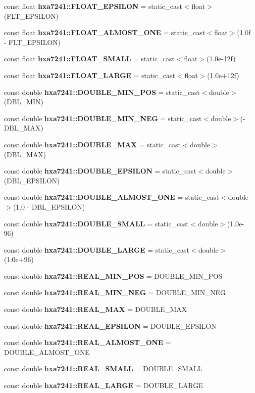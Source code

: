 \begin{CompactItemize}
\item 
const float {\bf hxa7241::FLOAT\_\-EPSILON} = static\_\-cast$<$float$>$(FLT\_\-EPSILON)
\item 
const float {\bf hxa7241::FLOAT\_\-ALMOST\_\-ONE} = static\_\-cast$<$float$>$(1.0f - FLT\_\-EPSILON)
\item 
const float {\bf hxa7241::FLOAT\_\-SMALL} = static\_\-cast$<$float$>$(1.0e-12f)
\item 
const float {\bf hxa7241::FLOAT\_\-LARGE} = static\_\-cast$<$float$>$(1.0e+12f)
\item 
const double {\bf hxa7241::DOUBLE\_\-MIN\_\-POS} = static\_\-cast$<$double$>$(DBL\_\-MIN)
\item 
const double {\bf hxa7241::DOUBLE\_\-MIN\_\-NEG} = static\_\-cast$<$double$>$(-DBL\_\-MAX)
\item 
const double {\bf hxa7241::DOUBLE\_\-MAX} = static\_\-cast$<$double$>$(DBL\_\-MAX)
\item 
const double {\bf hxa7241::DOUBLE\_\-EPSILON} = static\_\-cast$<$double$>$(DBL\_\-EPSILON)
\item 
const double {\bf hxa7241::DOUBLE\_\-ALMOST\_\-ONE} = static\_\-cast$<$double$>$(1.0 - DBL\_\-EPSILON)
\item 
const double {\bf hxa7241::DOUBLE\_\-SMALL} = static\_\-cast$<$double$>$(1.0e-96)
\item 
const double {\bf hxa7241::DOUBLE\_\-LARGE} = static\_\-cast$<$double$>$(1.0e+96)
\item 
const double {\bf hxa7241::REAL\_\-MIN\_\-POS} = DOUBLE\_\-MIN\_\-POS
\item 
const double {\bf hxa7241::REAL\_\-MIN\_\-NEG} = DOUBLE\_\-MIN\_\-NEG
\item 
const double {\bf hxa7241::REAL\_\-MAX} = DOUBLE\_\-MAX
\item 
const double {\bf hxa7241::REAL\_\-EPSILON} = DOUBLE\_\-EPSILON
\item 
const double {\bf hxa7241::REAL\_\-ALMOST\_\-ONE} = DOUBLE\_\-ALMOST\_\-ONE
\item 
const double {\bf hxa7241::REAL\_\-SMALL} = DOUBLE\_\-SMALL
\item 
const double {\bf hxa7241::REAL\_\-LARGE} = DOUBLE\_\-LARGE
\end{CompactItemize}
